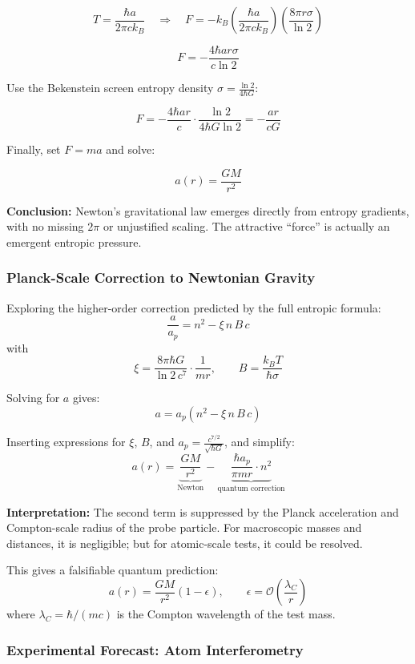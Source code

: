 \documentclass[12pt]{article}
\begin{document}
\[
T = \frac{\hbar a}{2\pi c k_{\!B}} \quad \Rightarrow \quad
F = -k_{\!B} \left( \frac{\hbar a}{2\pi c k_{\!B}} \right) \left( \frac{8\pi r \sigma}{\ln 2} \right)
\]

\[
F = - \frac{4 \hbar a r \sigma}{c \ln 2}
\]

Use the Bekenstein screen entropy density \( \sigma = \frac{\ln 2}{4 \hbar G} \):

\[
F = - \frac{4 \hbar a r}{c} \cdot \frac{\ln 2}{4 \hbar G \ln 2} = - \frac{a r}{c G}
\]

Finally, set \( F = m a \) and solve:

\[
a(r) = \frac{G M}{r^2}
\]

\noindent
\textbf{Conclusion:} Newton’s gravitational law emerges directly from entropy gradients, with no missing $2\pi$ or unjustified scaling. The attractive “force” is actually an emergent entropic pressure.

\subsubsection*{Planck-Scale Correction to Newtonian Gravity}

Exploring the higher-order correction predicted by the full entropic formula:
\[
\frac{a}{a_p} = n^2 - \xi\, n\, B\, c
\]
with
\[
\xi = \frac{8 \pi \hbar G}{\ln 2\, c^7} \cdot \frac{1}{m r}, \qquad
B = \frac{k_{\!B} T}{\hbar \sigma}
\]

Solving for $a$ gives:
\[
a = a_p \left( n^2 - \xi\, n\, B\, c \right)
\]

Inserting expressions for $\xi$, $B$, and $a_p = \frac{c^{7/2}}{\sqrt{\hbar G}}$, and simplify:
\[
a(r) = \underbrace{\frac{G M}{r^2}}_{\text{Newton}} - \underbrace{\frac{\hbar a_p}{\pi m r} \cdot n^2}_{\text{quantum correction}}
\]

\noindent
\textbf{Interpretation:} The second term is suppressed by the Planck acceleration and Compton-scale radius of the probe particle. For macroscopic masses and distances, it is negligible; but for atomic-scale tests, it could be resolved.

This gives a falsifiable quantum prediction:
\[
a(r) = \frac{G M}{r^2} \left( 1 - \epsilon \right), \qquad
\epsilon = \mathcal{O}\left( \frac{\lambda_C}{r} \right)
\]
where \( \lambda_C = \hbar/(m c) \) is the Compton wavelength of the test mass.

\subsubsection*{Experimental Forecast: Atom Interferometry}
\end{document}
